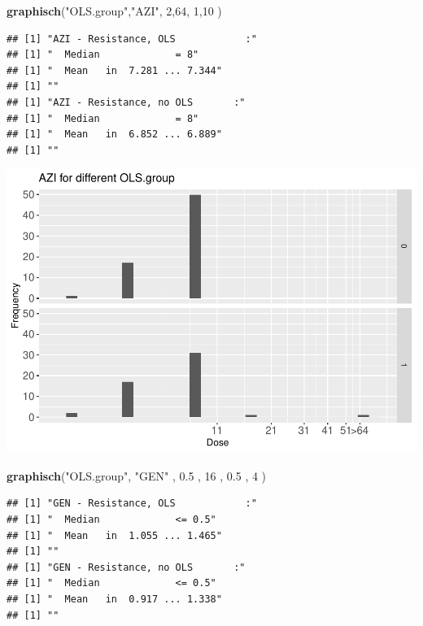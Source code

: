 \documentclass[
]{article}
\newenvironment{Shaded}{\begin{snugshade}}{\end{snugshade}}
\newcommand{\DecValTok}[1]{\textcolor[rgb]{0.00,0.00,0.81}{#1}}
\newcommand{\FloatTok}[1]{\textcolor[rgb]{0.00,0.00,0.81}{#1}}
\newcommand{\KeywordTok}[1]{\textcolor[rgb]{0.13,0.29,0.53}{\textbf{#1}}}
\newcommand{\NormalTok}[1]{#1}
\newcommand{\StringTok}[1]{\textcolor[rgb]{0.31,0.60,0.02}{#1}}
\begin{document}
\begin{Shaded}
\begin{Highlighting}[]
  \KeywordTok{graphisch}\NormalTok{(}\StringTok{"OLS.group"}\NormalTok{,}\StringTok{"AZI"}\NormalTok{, }\DecValTok{2}\NormalTok{,}\DecValTok{64}\NormalTok{, }\DecValTok{1}\NormalTok{,}\DecValTok{10}\NormalTok{    )}
\end{Highlighting}
\end{Shaded}

\begin{verbatim}
## [1] "AZI - Resistance, OLS            :"
## [1] "  Median             = 8"
## [1] "  Mean   in  7.281 ... 7.344"
## [1] ""
## [1] "AZI - Resistance, no OLS       :"
## [1] "  Median             = 8"
## [1] "  Mean   in  6.852 ... 6.889"
## [1] ""
\end{verbatim}

\includegraphics{Verteilungen_files/figure-latex/unnamed-chunk-21-1.pdf}

\begin{Shaded}
\begin{Highlighting}[]
  \KeywordTok{graphisch}\NormalTok{(}\StringTok{"OLS.group"}\NormalTok{, }\StringTok{"GEN"}\NormalTok{ , }\FloatTok{0.5}\NormalTok{  ,  }\DecValTok{16}\NormalTok{   ,   }\FloatTok{0.5}\NormalTok{  ,   }\DecValTok{4}\NormalTok{    )}
\end{Highlighting}
\end{Shaded}

\begin{verbatim}
## [1] "GEN - Resistance, OLS            :"
## [1] "  Median             <= 0.5"
## [1] "  Mean   in  1.055 ... 1.465"
## [1] ""
## [1] "GEN - Resistance, no OLS       :"
## [1] "  Median             <= 0.5"
## [1] "  Mean   in  0.917 ... 1.338"
## [1] ""
\end{verbatim}
\end{document}
